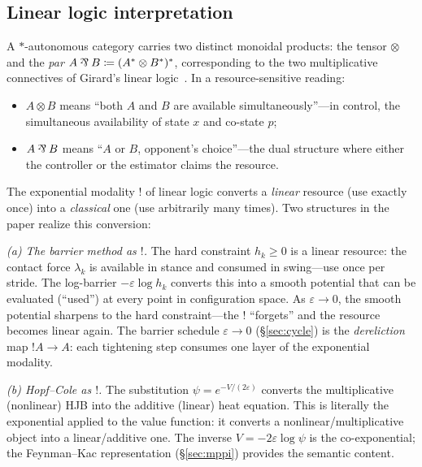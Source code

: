 \subsection*{Linear logic interpretation}

A $*$-autonomous category carries two distinct monoidal products:
the tensor $\otimes$ and the \emph{par}
$A \parr B \coloneqq (A^* \otimes B^*)^*$, corresponding to the two
multiplicative connectives of Girard's linear logic~\cite{Girard}.
In a resource-sensitive reading:
\begin{itemize}[nosep]
\item $A \otimes B$ means ``both $A$ and $B$ are available
  simultaneously''---in control, the simultaneous availability of
  state $x$ and co-state $p$;
\item $A \parr B$ means ``$A$ or $B$, opponent's choice''---the dual
  structure where either the controller or the estimator claims the
  resource.
\end{itemize}

The exponential modality $!$ of linear logic converts a \emph{linear}
resource (use exactly once) into a \emph{classical} one (use
arbitrarily many times).
Two structures in the paper realize this conversion:

\medskip\noindent\emph{(a) The barrier method as $!$.}
The hard constraint $h_k \geq 0$ is a linear resource: the contact
force $\lambda_k$ is available in stance and consumed in swing---use
once per stride.
The log-barrier $-\varepsilon\log h_k$ converts this into a smooth
potential that can be evaluated (``used'') at every point in
configuration space.
As $\varepsilon \to 0$, the smooth potential sharpens to the hard
constraint---the $!$ ``forgets'' and the resource becomes linear
again.
The barrier schedule $\varepsilon \to 0$ (\S\ref{sec:cycle}) is the
\emph{dereliction} map $!A \to A$: each tightening step consumes
one layer of the exponential modality.

\medskip\noindent\emph{(b) Hopf--Cole as $!$.}
The substitution $\psi = e^{-V/(2\varepsilon)}$ converts the
multiplicative (nonlinear) HJB into the additive (linear) heat
equation.
This is literally the exponential applied to the value function: it
converts a nonlinear/multiplicative object into a
linear/additive one.
The inverse $V = -2\varepsilon\log\psi$ is the co-exponential;
the Feynman--Kac representation (\S\ref{sec:mppi}) provides the
semantic content.

